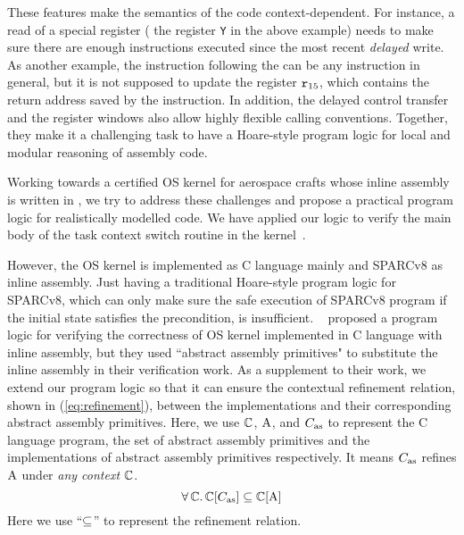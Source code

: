 These features make the semantics of the \sparc{} code
context-dependent. For instance, a read of a special register
(\eg{} the register {\tt Y} in the above example) needs to
make sure there are enough instructions executed since the
most recent {\em delayed} write. As another example,
the instruction following the \call{} can be any
instruction in general, but it is not supposed to
update the register $\texttt{r}_{15}$, which contains the return
address saved by the \call{} instruction.
In addition,
the delayed control transfer
and the register windows also allow highly flexible calling
conventions. Together, they make it a challenging task
to have a Hoare-style program logic for local and modular
reasoning of \sparc{} assembly code.

Working towards a certified OS kernel for aerospace
crafts whose inline assembly is written in \sparc,
we try to address these challenges and propose a practical
program logic for realistically modelled \sparc{} code.
We have applied our logic to verify the main body of
the task context switch routine in the kernel~\cite{zha18aplas}.

However, the OS kernel is implemented as
C language mainly and SPARCv8 as inline assembly.
Just having a traditional Hoare-style
program logic for SPARCv8, which can only make sure
the safe execution of SPARCv8 program if the initial
state satisfies the precondition, is insufficient.
~\cite{Xu16cav} proposed a program logic for
verifying the correctness of OS kernel implemented in
C language with inline assembly,
but they used ``abstract assembly primitives" to
substitute the inline assembly in their verification work.
As a supplement to their work, we extend our
program logic so that it can ensure the
contextual refinement relation,
shown in (\ref{eq:refinement}),
between the implementations and
their corresponding abstract assembly primitives.
Here, we use $\mathbb{C}$, $\text{A}$,
and $C_{\text{as}}$ to represent the C language program,
the set of abstract assembly
primitives and the implementations of
abstract assembly primitives respectively.
It means $C_{\text{as}}$ refines $\text{A}$ under
\textit{any context} $\mathbb{C}$.
\begin{equation}
    \forall \, \mathbb{C}. \,
    \mathbb{C}[C_{\text{as}}] \subseteq \mathbb{C}[\text{A}]
    \label{eq:refinement}
\end{equation}
%
Here we use ``$\subseteq$'' to represent the refinement
relation.
%

